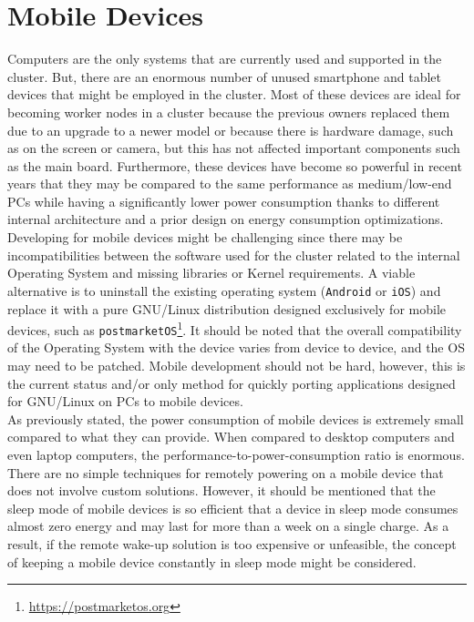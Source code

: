 \section{Mobile Devices}
\label{subsec:conclusions_limitations_and_future_works_mobile_devices}

Computers are the only systems that are currently used and supported in the
cluster. But, there are an enormous number of unused smartphone and tablet
devices that might be employed in the cluster. Most of these devices are ideal for
becoming worker nodes in a cluster because the previous owners replaced them due
to an upgrade to a newer model or because there is hardware damage, such as on
the screen or camera, but this has not affected important components such as the
main board. Furthermore, these devices have become so powerful in recent years that
they may be compared to the same performance as medium/low-end PCs while having a
significantly lower power consumption thanks to different internal architecture and
a prior design on energy consumption optimizations. \\ %
Developing for mobile devices might be challenging since there may be incompatibilities
between the software used for the cluster related to the internal Operating System
and missing libraries or Kernel requirements. A viable alternative is to
uninstall the existing operating system (\texttt{Android} or \texttt{iOS}) and
replace it with a pure GNU/Linux distribution designed exclusively for mobile
devices, such as \texttt{postmarketOS}\footnote{\url{https://postmarketos.org}}.
It should be noted that the overall compatibility of the Operating System with the
device varies from device to device, and the OS may need to be patched. Mobile development
should not be hard, however, this is the current status and/or only method for quickly
porting applications designed for GNU/Linux on PCs to mobile devices. \\ %
As previously stated, the power consumption of mobile devices is extremely small
compared to what they can provide. When compared to desktop computers and even laptop
computers, the performance-to-power-consumption ratio is enormous. There are no simple
techniques for remotely powering on a mobile device that does not involve custom
solutions. However, it should be mentioned that the sleep mode of mobile devices
is so efficient that a device in sleep mode consumes almost zero energy and may last
for more than a week on a single charge. As a result, if the remote wake-up solution
is too expensive or unfeasible, the concept of keeping a mobile device
constantly in sleep mode might be considered.

